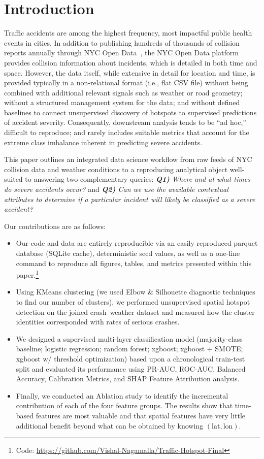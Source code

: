\documentclass{article}
\begin{document}
\section{Introduction}
\label{sec:intro}

Traffic accidents are among the highest frequency, most impactful public
health events in cities. In addition to publishing hundreds of thousands of
collision reports annually through NYC Open Data~\cite{nyc_collisions}, the
NYC Open Data platform provides collision information about incidents,
which is detailed in both time and space. However, the data itself, while
extensive in detail for location and time, is provided typically in a
non-relational format (i.e., flat CSV file) without being combined with
additional relevant signals such as weather or road geometry; without a
structured management system for the data; and without defined baselines
to connect unsupervised discovery of hotspots to supervised predictions of
accident severity. Consequently, downstream analysis tends to be ``ad hoc,''
difficult to reproduce; and rarely includes suitable metrics that account
for the extreme class imbalance inherent in predicting severe accidents.

This paper outlines an integrated data science workflow from raw feeds of
NYC collision data and weather conditions to a reproducing analytical
object well-suited to answering two complementary queries:
\textit{\textbf{Q1)} Where and at what times do severe accidents occur?}
and
\textit{\textbf{Q2)} Can we use the available contextual attributes to
determine if a particular incident will likely be classified as a severe
accident?}

Our contributions are as follows:
\begin{itemize}
\item Our code and data are entirely reproducible via an easily reproduced
parquet database (SQLite cache), deterministic seed values, as well as a
one-line command to reproduce all figures, tables, and metrics presented
within this
paper.\footnote{Code: \url{https://github.com/Vishal-Nagamalla/Traffic-Hotspot-Final}}
\item Using KMeans clustering (we used Elbow \& Silhouette diagnostic
techniques to find our number of clusters), we performed unsupervised
spatial hotspot detection on the joined crash--weather dataset and measured
how the cluster identities corresponded with rates of serious crashes.
\item We designed a supervised multi-layer classification model
(majority-class baseline; logistic regression; random forest; xgboost;
xgboost + SMOTE; xgboost w/ threshold optimization) based upon a
chronological train-test split and evaluated its performance using PR-AUC,
ROC-AUC, Balanced Accuracy, Calibration Metrics, and SHAP Feature
Attribution analysis.
\item Finally, we conducted an Ablation study to identify the incremental
contribution of each of the four feature groups. The results show that
time-based features are most valuable and that spatial features have very
little additional benefit beyond what can be obtained by knowing
$(\mathrm{lat}, \mathrm{lon})$.
\end{itemize}
\end{document}

